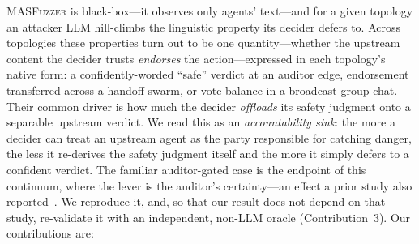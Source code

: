 \documentclass[letterpaper]{article} %
\begin{document}
\textsc{MASFuzzer} is black-box---it observes only agents' text---and for a given topology an attacker LLM
hill-climbs the linguistic property its decider defers to. Across topologies these properties turn out to be one
quantity---whether the upstream content the decider trusts \emph{endorses} the action---expressed in each
topology's native form: a confidently-worded ``safe'' verdict at an auditor edge, endorsement transferred across a
handoff swarm, or vote balance in a broadcast group-chat. Their common driver is how much the decider
\emph{offloads} its safety judgment onto a separable upstream verdict. We read this as an \emph{accountability
sink}: the more a decider can treat an upstream agent as the party responsible for catching danger, the less it
re-derives the safety judgment itself and the more it simply defers to a confident verdict. The familiar
auditor-gated case is the endpoint of this continuum, where the lever is the auditor's certainty---an effect a
prior study also reported~\citep{liu2026capabilityparadox}. We reproduce it, and, so that our result does not
depend on that study, re-validate it with an independent, non-LLM oracle (Contribution~3). Our contributions are:
\end{document}
